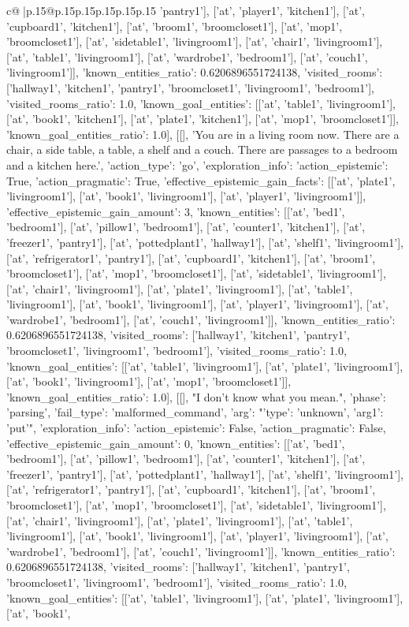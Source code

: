 \documentclass{article}
\begin{document}
{\begin{supertabular}{c@{$\;$}|p{.15\linewidth}@{}p{.15\linewidth}p{.15\linewidth}p{.15\linewidth}p{.15\linewidth}p{.15\linewidth}}
{{{'pantry1'], ['at', 'player1', 'kitchen1'], ['at', 'cupboard1', 'kitchen1'], ['at', 'broom1', 'broomcloset1'], ['at', 'mop1', 'broomcloset1'], ['at', 'sidetable1', 'livingroom1'], ['at', 'chair1', 'livingroom1'], ['at', 'table1', 'livingroom1'], ['at', 'wardrobe1', 'bedroom1'], ['at', 'couch1', 'livingroom1']], 'known_entities_ratio': 0.6206896551724138, 'visited_rooms': ['hallway1', 'kitchen1', 'pantry1', 'broomcloset1', 'livingroom1', 'bedroom1'], 'visited_rooms_ratio': 1.0, 'known_goal_entities': [['at', 'table1', 'livingroom1'], ['at', 'book1', 'kitchen1'], ['at', 'plate1', 'kitchen1'], ['at', 'mop1', 'broomcloset1']], 'known_goal_entities_ratio': 1.0}}], [[], 'You are in a living room now. There are a chair, a side table, a table, a shelf and a couch. There are passages to a bedroom and a kitchen here.', {'action_type': 'go', 'exploration_info': {'action_epistemic': True, 'action_pragmatic': True, 'effective_epistemic_gain_facts': [['at', 'plate1', 'livingroom1'], ['at', 'book1', 'livingroom1'], ['at', 'player1', 'livingroom1']], 'effective_epistemic_gain_amount': 3, 'known_entities': [['at', 'bed1', 'bedroom1'], ['at', 'pillow1', 'bedroom1'], ['at', 'counter1', 'kitchen1'], ['at', 'freezer1', 'pantry1'], ['at', 'pottedplant1', 'hallway1'], ['at', 'shelf1', 'livingroom1'], ['at', 'refrigerator1', 'pantry1'], ['at', 'cupboard1', 'kitchen1'], ['at', 'broom1', 'broomcloset1'], ['at', 'mop1', 'broomcloset1'], ['at', 'sidetable1', 'livingroom1'], ['at', 'chair1', 'livingroom1'], ['at', 'plate1', 'livingroom1'], ['at', 'table1', 'livingroom1'], ['at', 'book1', 'livingroom1'], ['at', 'player1', 'livingroom1'], ['at', 'wardrobe1', 'bedroom1'], ['at', 'couch1', 'livingroom1']], 'known_entities_ratio': 0.6206896551724138, 'visited_rooms': ['hallway1', 'kitchen1', 'pantry1', 'broomcloset1', 'livingroom1', 'bedroom1'], 'visited_rooms_ratio': 1.0, 'known_goal_entities': [['at', 'table1', 'livingroom1'], ['at', 'plate1', 'livingroom1'], ['at', 'book1', 'livingroom1'], ['at', 'mop1', 'broomcloset1']], 'known_goal_entities_ratio': 1.0}}], [[], "I don't know what you mean.", {'phase': 'parsing', 'fail_type': 'malformed_command', 'arg': "{'type': 'unknown', 'arg1': 'put'}", 'exploration_info': {'action_epistemic': False, 'action_pragmatic': False, 'effective_epistemic_gain_amount': 0, 'known_entities': [['at', 'bed1', 'bedroom1'], ['at', 'pillow1', 'bedroom1'], ['at', 'counter1', 'kitchen1'], ['at', 'freezer1', 'pantry1'], ['at', 'pottedplant1', 'hallway1'], ['at', 'shelf1', 'livingroom1'], ['at', 'refrigerator1', 'pantry1'], ['at', 'cupboard1', 'kitchen1'], ['at', 'broom1', 'broomcloset1'], ['at', 'mop1', 'broomcloset1'], ['at', 'sidetable1', 'livingroom1'], ['at', 'chair1', 'livingroom1'], ['at', 'plate1', 'livingroom1'], ['at', 'table1', 'livingroom1'], ['at', 'book1', 'livingroom1'], ['at', 'player1', 'livingroom1'], ['at', 'wardrobe1', 'bedroom1'], ['at', 'couch1', 'livingroom1']], 'known_entities_ratio': 0.6206896551724138, 'visited_rooms': ['hallway1', 'kitchen1', 'pantry1', 'broomcloset1', 'livingroom1', 'bedroom1'], 'visited_rooms_ratio': 1.0, 'known_goal_entities': [['at', 'table1', 'livingroom1'], ['at', 'plate1', 'livingroom1'], ['at', 'book1', }}}
\end{supertabular}}
\end{document}
